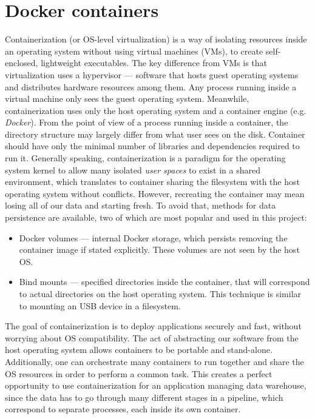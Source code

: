 \section{Docker containers}
Containerization (or OS-level virtualization) is a way of isolating resources inside an operating system without using virtual machines (VMs), to create self-enclosed, lightweight executables. The key difference from VMs is that virtualization uses a hypervisor --- software that hosts guest operating systems and distributes hardware resources among them. Any process running inside a virtual machine only sees the guest operating system. Meanwhile, containerization uses only the host operating system and a container engine (e.g. \textit{Docker}). From the point of view of a process running inside a container, the directory structure may largely differ from what user sees on the disk. Container should have only the minimal number of libraries and dependencies required to run it. Generally speaking, containerization is a paradigm for the operating system kernel to allow many isolated \textit{user spaces} to exist in a shared environment, which translates to container sharing the filesystem with the host operating system without conflicts. However, recreating the container may mean losing all of our data and starting fresh. To avoid that, methods for data persistence are available, two of which are most popular and used in this project:

\begin{itemize}
    \item Docker volumes --- internal Docker storage, which persists removing the container image if stated explicitly. These volumes are not seen by the host OS.
    \item Bind mounts --- specified directories inside the container, that will correspond to actual directories on the host operating system. This technique is similar to mounting an USB device in a filesystem.
\end{itemize}

The goal of containerization is to deploy applications securely and fast, without worrying about OS compatibility. The act of abstracting our software from the host operating system allows containers to be portable and stand-alone. Additionally, one can orchestrate many containers to run together and share the OS resources in order to perform a common task. This creates a perfect opportunity to use containerization for an application managing data warehouse, since the data has to go through many different stages in a pipeline, which correspond to separate processes, each inside its own container.


